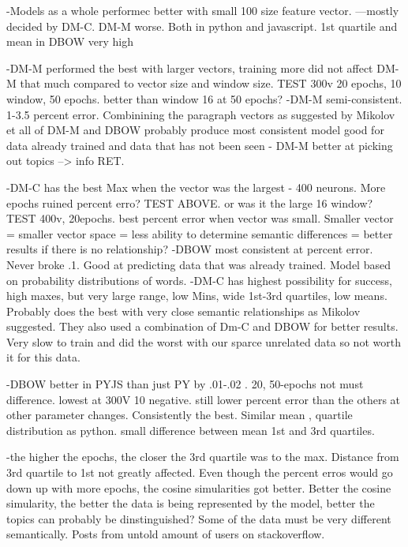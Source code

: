 -Models as a whole performec better with small 100 size feature vector. ---mostly decided by DM-C. DM-M worse. Both in python and javascript. 1st quartile and mean in DBOW very high

-DM-M performed the best with larger vectors, training more did not affect DM-M that much compared to vector size and window size. TEST 300v 20 epochs, 10 window, 50 epochs. better than window 16 at 50 epochs? 
-DM-M semi-consistent. 1-3.5 percent error. Combinining the paragraph vectors as suggested by Mikolov et all of DM-M and DBOW probably produce most consistent model good for data already trained and data that has not been seen - DM-M better at picking out topics  --> info RET.

-DM-C has the best Max when the vector was the largest - 400 neurons. More epochs ruined percent erro? TEST ABOVE. or was it the large 16 window? TEST 400v, 20epochs. best percent error when vector was small. Smaller vector = smaller vector space = less ability to determine semantic differences = better results if there is no relationship? -DBOW most consistent at percent error. Never broke .1. Good at predicting data that was already trained. Model based on probability distributions of words.
-DM-C has highest possibility for success, high maxes, but very large range, low Mins, wide 1st-3rd quartiles, low means. Probably does the best with very close semantic relationships as Mikolov suggested. They also used a combination of Dm-C and DBOW for better results. Very slow to train and did the worst with our sparce unrelated data so not worth it for this data.


-DBOW better in PYJS than just PY by .01-.02 . 20, 50-epochs not must difference. lowest at 300V 10 negative. still lower percent error than the others at other parameter changes. Consistently the best. Similar mean , quartile distribution as python. small difference between mean 1st and 3rd quartiles.


-the higher the epochs, the closer the 3rd quartile was to the max. Distance from 3rd quartile to 1st not greatly affected. Even though the percent erros would go down up with more epochs, the cosine simularities got better. Better the cosine simularity, the better the data is being represented by the model, better the topics can probably be dinstinguished? Some of the data must be very different semantically. Posts from untold amount of users on stackoverflow. 





